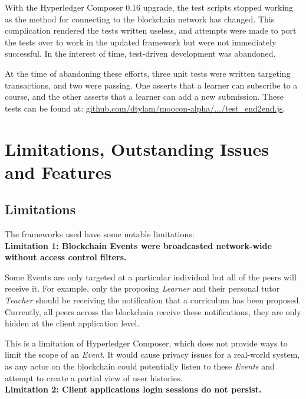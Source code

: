With the Hyperledger Composer 0.16 upgrade, the test scripts stopped working as 
the method for connecting to the blockchain network has changed. This complication 
rendered the tests written useless, and attempts were made to port the tests over 
to work in the updated framework but were not immediately successful. In the interest of 
time, test-driven development was abandoned.

At the time of abandoning these efforts, three unit tests were written targeting transactions, 
and two were passing. One asserts that a learner can subscribe to a course, 
and the other asserts that a learner can add a new submission. 
These tests can be found at: \href{https://github.com/dtylam/moocon-alpha/blob/master/test/test_end2end.js}
{\underline{github.com/dtylam/moocon-alpha/.../test\_end2end.js}}.

\section{Limitations, Outstanding Issues and Features}

\subsection{Limitations}

The frameworks used have some notable limitations:
\vspace{0.25cm}\\
\textbf{Limitation 1: Blockchain Events were broadcasted network-wide without access control filters.}

Some Events are only targeted at a particular individual but all of the peers will receive it.
For example, only the proposing \textit{Learner} and their personal tutor \textit{Teacher} should 
be receiving the notification that a curriculum has been proposed. Currently, all peers across the 
blockchain receive these notifications, they are only hidden at the client application level.

This is a limitation of Hyperledger Composer, which does not provide ways to limit the scope of an \textit{Event}.
It would cause privacy issues for a real-world system, as any actor on the blockchain could potentially 
listen to these \textit{Events} and attempt to create a partial view of user histories.
\vspace{0.25cm}\\
\textbf{Limitation 2: Client applications login sessions do not persist.}

